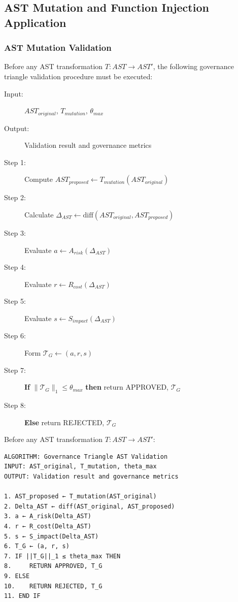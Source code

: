 \subsection{AST Mutation and Function Injection Application}
\subsubsection{AST Mutation Validation}
Before any AST transformation $T: AST \rightarrow AST'$, the following governance triangle validation procedure must be executed:

\begin{description}
    \item[Input:] $AST_{original}$, $T_{mutation}$, $\theta_{max}$
    \item[Output:] Validation result and governance metrics
    \item[Step 1:] Compute $AST_{proposed} \leftarrow T_{mutation}(AST_{original})$
    \item[Step 2:] Calculate $\Delta_{AST} \leftarrow \text{diff}(AST_{original}, AST_{proposed})$
    \item[Step 3:] Evaluate $a \leftarrow A_{risk}(\Delta_{AST})$
    \item[Step 4:] Evaluate $r \leftarrow R_{cost}(\Delta_{AST})$
    \item[Step 5:] Evaluate $s \leftarrow S_{impact}(\Delta_{AST})$
    \item[Step 6:] Form $\mathcal{T}_G \leftarrow (a, r, s)$
    \item[Step 7:] \textbf{If} $\|\mathcal{T}_G\|_1 \leq \theta_{max}$ \textbf{then} return APPROVED, $\mathcal{T}_G$
    \item[Step 8:] \textbf{Else} return REJECTED, $\mathcal{T}_G$
\end{description}

Before any AST transformation $T: AST \rightarrow AST'$:

\begin{lstlisting}[style=riftlang, caption={Governance Triangle AST Validation}]
ALGORITHM: Governance Triangle AST Validation
INPUT: AST_original, T_mutation, theta_max
OUTPUT: Validation result and governance metrics

1. AST_proposed ← T_mutation(AST_original)
2. Delta_AST ← diff(AST_original, AST_proposed)
3. a ← A_risk(Delta_AST)
4. r ← R_cost(Delta_AST)
5. s ← S_impact(Delta_AST)
6. T_G ← (a, r, s)
7. IF ||T_G||_1 ≤ theta_max THEN
8.     RETURN APPROVED, T_G
9. ELSE
10.    RETURN REJECTED, T_G
11. END IF
\end{lstlisting}

